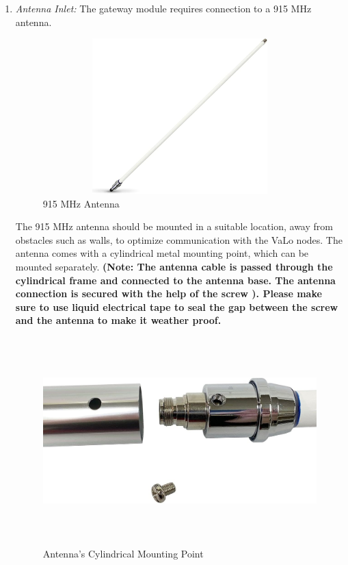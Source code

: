 \documentclass[12pt]{article}
\begin{document}
\begin{itemize}
\begin{enumerate}
        \item \textit{Antenna Inlet:} The gateway module requires connection to a 915 MHz antenna. 
        
        \begin{figure}[H]
             \centering
             \includegraphics[width=12cm,height=6cm,]{figures/antenna.png}
             \centering
            \caption{915 MHz Antenna}\label{Fig:Antenna}
        \end{figure}
        
        The 915 MHz antenna should be mounted in a suitable location, away from obstacles such as walls, to optimize communication with the VaLo nodes. The antenna comes with a cylindrical metal mounting point, which can be mounted separately. \textbf{(Note: The antenna cable is passed through the cylindrical frame and connected to the antenna base. The antenna connection is secured with the help of the screw ). Please make sure to use liquid electrical tape to seal the gap between the screw and the antenna to make it weather proof.}
        \begin{figure}[H]
             \centering
             \includegraphics[width=12cm,height=8cm,]{figures/antenna_mount.png}
             \centering
            \caption{Antenna's Cylindrical Mounting Point}\label{Fig:Cylindrical Mounting Point}
        \end{figure}
        

\end{enumerate}
\end{itemize}
\end{document}
